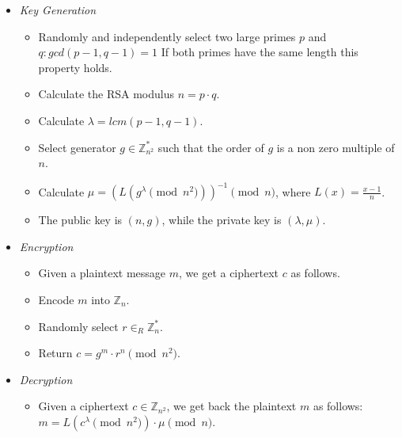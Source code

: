 \begin{itemize}
  \item \textit{Key Generation}
  \begin{itemize}
    \item Randomly and independently select two large primes $p$ and \\$ q :gcd(p-1, q-1) = 1$ If both primes have the same length this property holds.
    \item Calculate the RSA modulus $n = p \cdot q$.
    \item Calculate $\lambda = lcm(p-1, q-1)$.
    \item Select generator $g \in \mathbb{Z}_{n^{2}}^{*}$ such that the order of $g$ is a non zero multiple of $n$.
    \item Calculate $\mu = (L(g^{\lambda} \pmod{n^{2}}))^{-1} \pmod{n}$, where $L(x) = \frac{x-1}{n}$.
    \item The public key is $ (n,g) $, while the private key is $ (\lambda, \mu) $.
  \end{itemize}
  \item \textit{Encryption}
  \begin{itemize}
    \item Given a plaintext message $m$, we get a ciphertext $c$ as follows.
    \item Encode $m$ into $\mathbb{Z}_{n}$.
    \item Randomly select $ r \in_{R} \mathbb{Z}_{n}^{*}$.
    \item Return $c = g^{m} \cdot r^{n} \pmod{n^{2}}$.
  \end{itemize}
  \item \textit{Decryption}
  \begin{itemize}
    \item Given a ciphertext $c \in \mathbb{Z}_{n^{2}}$, we get back the plaintext $m$ as follows: \\$m = L(c^{\lambda} \pmod{n^{2}}) \cdot \mu \pmod{n}$.
  \end{itemize}
\end{itemize}
